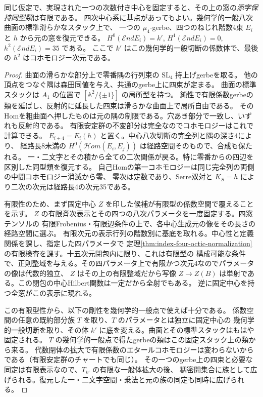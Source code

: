\begin{theorem}\label{thm:octic-surface-fixed-center}
同じ仮定で、実現された一つの次数付き中心を固定すると、その上の窓の\emph{添字保持同型類}は有限である。
四次中心系に基点があってもよい。幾何学的一般八次曲面の標準滑らかなスタック上で、
一つの $\mu_4$-gerbe、四つのねじれ階数4束 $E_i$ と $h$ から元の窓を復元できる。
$H^0(\mathcal End E_i)=k'$, $H^1(\mathcal End E_i)=0$, $h^2(\mathcal End E_i)=35$ である。
ここで $k'$ はこの幾何学的一般切断の係数体で、最後の $h^2$ はコホモロジー次元である。
\end{theorem}
\begin{proof}
曲面の滑らかな部分上で零番隅の行列束の $\mathrm{SL}_4$ 持上げgerbeを取る。
他の頂点をつなぐ隅は森田同値を与え、共通のgerbe上に四束が定まる。
曲面の標準スタックは $A_1$ の位置で $[\mathbb A^2/\{\pm1\}]$ の局所型を持つ。
純性で有限係数gerbeの類を延ばし、反射的に延長した四束は滑らかな曲面上で局所自由である。
そのHomを粗曲面へ押したものは元の隅の制限である。穴あき部分で一致し、いずれも反射的である。
有限安定群の不変部分は完全なのでコホモロジーはこれで計算できる。
$E_{i+4}=E_i(h)$ と置く。中心八次切断の完全列と隅の深さ4により、
経路長8未満の $H^0(\mathcal Hom(E_i,E_j))$ は経路空間そのもので、合成も保たれる。
一・二文字とその積から全ての二次関係が戻る。特に零番からの四辺を区別した同型類を復元する。
自己Homの第一コホモロジーは同じ完全列の両側の中間コホモロジー消滅から零、
零次は定数であり、Serre双対と $K_S=h$ により二次の次元は経路長4の次元35である。

有限性のため、まず固定中心 $Z$ を印した候補が有限型の係数空間で覆えることを示す。
$Z$ の有限斉次表示とその四つの八次パラメータを一度固定する。四窓テンソルの
有限Frobenius・有限辺条件の上で、各中心生成元の像をその長さの経路空間に選ぶ。
有限次元の表示行列の階数別に基底を取れる。中心性と定義関係を課し、指定した四パラメータで
定理\ref{thm:index-four-octic-normalization}の有限検査を課す。十五次元閉包内に限り、これは有限型の
構成可能な条件で、正則整域を与える。その四パラメータ上で有限かつ次元4なのでパラメータの像は代数的独立、
$Z$ はその上の有限整域だから写像 $Z\to Z(B)$ は単射である。この閉包の中心Hilbert関数は一定だから全射でもある。
逆に固定中心を持つ全窓がこの表示に現れる。

この有限型性から、以下の剛性を幾何学的一般点で使えば十分である。
係数空間の任意の既約部分族 $T$ を取り、$T$ のパラメータとは独立に固定中心の
幾何学的一般切断を取り、その体 $k'$ に底を変える。曲面とその標準スタックはもはや固定される。
$T$ の幾何学的一般点で得たgerbeの類はこの固定スタック上の類から来る。
代数閉体の拡大で有限係数のエタールコホモロジーは変わらないからである（有限安定群のチャートでも同じ）。
その一つのgerbe上の四束と必要な同定は有限表示なので、$T_{k'}$ の有限な一般体拡大の後、
稠密開集合に族として広げられる。復元した一・二文字空間・乗法と元の族の同定も同時に広げられる。


\end{proof}
